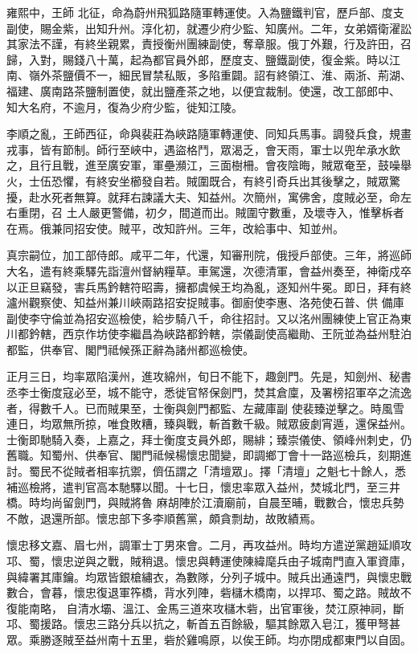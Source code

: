 \begin{pinyinscope}
 雍熙中，王師
 北征，命為蔚州飛狐路隨軍轉運使。入為鹽鐵判官，歷戶部、度支副使，賜金紫，出知升州。淳化初，就遷少府少監、知廣州。二年，女弟婿衛濯訟其家法不謹，有終坐親累，責授衡州團練副使，奪章服。俄丁外艱，行及許田，召歸，入對，賜錢八十萬，起為都官員外郎，歷度支、鹽鐵副使，復金紫。時以江南、嶺外茶鹽價不一，細民冒禁私販，多陷重闢。詔有終領江、淮、兩浙、荊湖、福建、廣南路茶鹽制置使，就出鹽產茶之地，以便宜裁制。使還，改工部郎中、
 知大名府，不逾月，復為少府少監，徙知江陵。



 李順之亂，王師西征，命與裴莊為峽路隨軍轉運使、同知兵馬事。調發兵食，規畫戎事，皆有節制。師行至峽中，遇盜格鬥，眾渴乏，會天雨，軍士以兜牟承水飲之，且行且戰，進至廣安軍，軍壘瀕江，三面樹柵。會夜陰晦，賊眾奄至，鼓噪舉火，士伍恐懼，有終安坐櫛發自若。賊圍既合，有終引奇兵出其後擊之，賊眾驚擾，赴水死者無算。就拜右諫議大夫、知益州。次簡州，寓佛舍，度賊必至，命左右重閉，召
 土人嚴更警備，初夕，間道而出。賊圍守數重，及壞寺入，惟擊柝者在焉。俄兼同招安使。賊平，改知許州。三年，改給事中、知並州。



 真宗嗣位，加工部侍郎。咸平二年，代還，知審刑院，俄授戶部使。三年，將巡師大名，遣有終乘驛先詣澶州督納糧草。車駕還，次德清軍，會益州奏至，神衛戍卒以正旦竊發，害兵馬鈐轄符昭壽，擁都虞候王均為亂，逐知州牛冕。即日，拜有終瀘州觀察使、知益州兼川峽兩路招安捉賊事。御廚使李惠、洛苑使石普、供
 備庫副使李守倫並為招安巡檢使，給步騎八千，命往招討。又以洺州團練使上官正為東川都鈐轄，西京作坊使李繼昌為峽路都鈐轄，崇儀副使高繼勛、王阮並為益州駐泊都監，供奉官、閣門祗候孫正辭為諸州都巡檢使。



 正月三日，均率眾陷漢州，進攻綿州，旬日不能下，趣劍門。先是，知劍州、秘書丞李士衡度寇必至，城不能守，悉徙官帑保劍門，焚其倉廩，及署榜招軍卒之流逸者，得數千人。已而賊果至，士衡與劍門都監、左藏庫副
 使裴臻逆擊之。時風雪連日，均眾無所掠，唯食敗糟，臻與戰，斬首數千級。賊眾疲劇宵遁，還保益州。士衡即馳騎入奏，上嘉之，拜士衡度支員外郎，賜緋；臻崇儀使、領峰州刺史，仍舊職。知蜀州、供奉官、閣門祗候楊懷忠聞變，即調鄉丁會十一路巡檢兵，刻期進討。蜀民不從賊者相率抗禦，儕伍謂之「清壇眾」。擇「清壇」之魁七十餘人，悉補巡檢將，遣判官高本馳驛以聞。十七日，懷忠率眾入益州，焚城北門，至三井橋。時均尚留劍門，與賊將魯
 麻胡陣於江瀆廟前，自晨至晡，戰數合，懷忠兵勢不敵，退還所部。懷忠部下多李順舊黨，頗貪剽劫，故敗績焉。



 懷忠移文嘉、眉七州，調軍士丁男來會。二月，再攻益州。時均方遣逆黨趙延順攻邛、蜀，懷忠逆與之戰，賊稍退。懷忠與轉運使陳緯麾兵由子城南門直入軍資庫，與緯署其庫鑰。均眾皆銀槍繡衣，為數隊，分列子城中。賊兵出通遠門，與懷忠戰數合，會暮，懷忠復退軍筰橋，背水列陣，砦櫧木橋南，以捍邛、蜀之路。賊故不復能南略，
 自清水壩、溫江、金馬三道來攻櫧木砦，出官軍後，焚江原神祠，斷邛、蜀援路。懷忠三路分兵以抗之，斬首五百餘級，驅其餘眾入皂江，獲甲弩甚眾。乘勝逐賊至益州南十五里，砦於雞鳴原，以俟王師。均亦閉成都東門以自固。




\end{pinyinscope}
